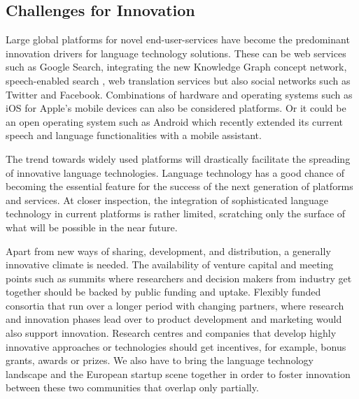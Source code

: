 \documentclass[10pt, plain]{../../metanetpaper}
\begin{document}
\begin{multicols}{2}

\subsection{Challenges for Innovation}
\label{sec:powerf-mech-showcasing-and-innovation}


Large global platforms for novel end-user-services have become the predominant innovation drivers for language technology solutions. These can be web services such as Google Search, integrating the new Knowledge Graph concept network, speech-enabled search \cite{meisel12}, web translation services but also social networks such as Twitter and Facebook. Combinations of hardware and operating systems such as iOS for Apple's mobile devices can also be considered platforms. Or it could be an open operating system such as Android which recently extended its current speech and language functionalities with a mobile assistant.

The trend towards widely used platforms will drastically facilitate the spreading of innovative language technologies. Language technology has a good chance of becoming the essential feature for the success of the next generation of platforms and services. At closer inspection, the integration of sophisticated language technology in current platforms is rather limited, scratching only the surface of what will be possible in the near future.

Apart from new ways of sharing, development, and distribution, a generally innovative climate is needed. The availability of venture capital and meeting points such as summits where researchers and decision makers from industry get together should be backed by public funding and uptake. Flexibly funded consortia that run over a longer period with changing partners, where research and innovation phases lead over to product development and marketing would also support innovation. Research centres and companies that develop highly innovative approaches or technologies should get incentives, for example, bonus grants, awards or prizes. We also have to bring the language technology landscape and the European startup scene together in order to foster innovation between these two communities that overlap only partially.


\end{multicols}
\end{document}

